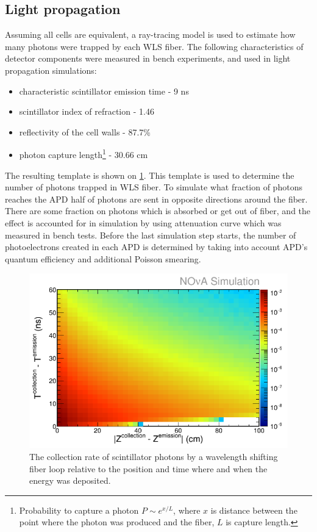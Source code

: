 \subsection{Light propagation}
Assuming all cells are equivalent, a ray-tracing model is used to estimate how many photons were trapped by
each WLS fiber. The following characteristics of detector components were measured in bench experiments, and
used in light propagation simulations:
\begin{itemize}
\item characteristic scintillator emission time - 9 ns
\item scintillator index of refraction - 1.46
\item reflectivity of the cell walls - 87.7\%
\item photon capture length\footnote{Probability to capture a photon $P \sim e^{x/L}$, where
$x$ is distance between the point where the photon was produced and the fiber, $L$ is capture length.} - 30.66 cm
\end{itemize}
The resulting template is shown on \ref{fig:Coll_rate}. This template is used to determine the number of photons 
trapped in WLS fiber. To simulate what fraction of photons reaches the APD
half of photons are sent in opposite directions around the fiber. There are some fraction on photons which is 
absorbed or get out of fiber, and the effect is accounted for in simulation by using attenuation curve which was 
measured in bench tests. Before the last simulation step starts, the number of photoelectrons created in each APD
is determined by taking into account APD's quantum efficiency and additional Poisson smearing.
\begin{figure}
\includegraphics[width=1.0\textwidth]{figures/Coll_rate.png}
\centering
\caption{The collection rate of scintillator photons by a wavelength shifting fiber loop relative to the position 
	and time where and when the energy was deposited.} \label{fig:Coll_rate}
\end{figure}
